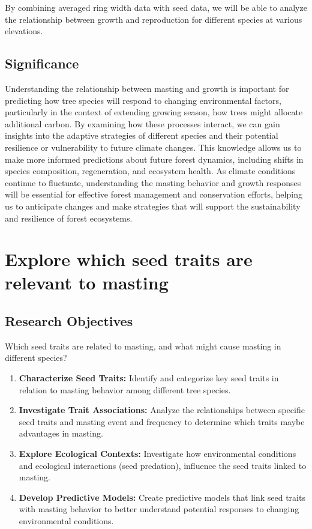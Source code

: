 \documentclass[12pt,letter]{article}
\begin{document}
By combining averaged ring width data with seed data, we will be able to analyze the relationship between growth and reproduction for different species at various elevations.

\subsection{Significance}
Understanding the relationship between masting and growth is important for predicting how tree species will respond to changing environmental factors, particularly in the context of extending growing season, how trees might allocate additional carbon. By examining how these processes interact, we can gain insights into the adaptive strategies of different species and their potential resilience or vulnerability to future climate changes. This knowledge allows us to make more informed predictions about future forest dynamics, including shifts in species composition, regeneration, and ecosystem health. As climate conditions continue to fluctuate, understanding the  masting behavior and growth responses will be essential for effective forest management and conservation efforts, helping us to anticipate changes and make strategies that will support the sustainability and resilience of forest ecosystems.

\section{Explore which seed traits are relevant to masting}

\subsection{Research Objectives}
Which seed traits are related to masting, and what might cause masting in different species?
	\begin{enumerate}
	\item \textbf{Characterize Seed Traits:} Identify and categorize key seed traits in relation to masting behavior among different tree species.
	\item \textbf{Investigate Trait Associations:} Analyze the relationships between specific seed traits and masting event and frequency to determine which traits maybe advantages in masting.
	\item \textbf{Explore Ecological Contexts:} Investigate how environmental conditions and ecological interactions (seed predation), influence the seed traits linked to masting.
	\item \textbf{Develop Predictive Models:} Create predictive models that link seed traits with masting behavior to better understand potential responses to changing environmental conditions.
	\end{enumerate}
\end{document}
